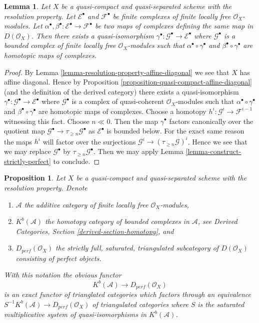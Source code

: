 \documentclass{stacks-project}
\theoremstyle{plain}
\newtheorem{proposition}[subsection]{Proposition}
\newtheorem{lemma}[subsection]{Lemma}
\theoremstyle{definition}
\theoremstyle{remark}
\numberwithin{equation}{subsection}
\begin{document}
\begin{lemma}
\label{lemma-resolution-property-homotopy-map-perfect-complex}
Let $X$ be a quasi-compact and quasi-separated scheme with the
resolution property. Let $\mathcal{E}^\bullet$ and $\mathcal{F}^\bullet$
be finite complexes of finite locally free $\mathcal{O}_X$-modules.
Let $\alpha^\bullet, \beta^\bullet :\mathcal{E}^\bullet \to \mathcal{F}^\bullet$
be two maps of complexes defining the same map in $D(\mathcal{O}_X)$.
Then there exists a quasi-isomorphism
$\gamma^\bullet : \mathcal{G}^\bullet \to \mathcal{E}^\bullet$
where $\mathcal{G}^\bullet$ is a bounded complex of finite locally free
$\mathcal{O}_X$-modules
such that $\alpha^\bullet \circ \gamma^\bullet$ and
$\beta^\bullet \circ \gamma^\bullet$ are homotopic maps of complexes.
\end{lemma}

\begin{proof}
By Lemma \ref{lemma-resolution-property-affine-diagonal}
we see that $X$ has affine diagonal. Hence by
Proposition \ref{proposition-quasi-compact-affine-diagonal}
(and the definition of the derived category)
there exists a quasi-isomorphism
$\gamma^\bullet : \mathcal{G}^\bullet \to \mathcal{E}^\bullet$
where $\mathcal{G}^\bullet$ is a complex of quasi-coherent
$\mathcal{O}_X$-modules
such that $\alpha^\bullet \circ \gamma^\bullet$ and
$\beta^\bullet \circ \gamma^\bullet$ are homotopic maps of complexes.
Choose a homotopy $h^i : \mathcal{G}^i \to \mathcal{F}^{i - 1}$
witnessing this fact. Choose $n \ll 0$. Then the map
$\gamma^\bullet$ factors canonically over the quotient
map $\mathcal{G}^\bullet \to \tau_{\geq n}\mathcal{G}^\bullet$
as $\mathcal{E}^\bullet$ is bounded below. For the exact same
reason the maps $h^i$ will factor over the surjections
$\mathcal{G}^i \to (\tau_{\geq n}\mathcal{G})^i$.
Hence we see that we may replace $\mathcal{G}^\bullet$
by $\tau_{\geq n}\mathcal{G}^\bullet$.
Then we may apply Lemma \ref{lemma-construct-strictly-perfect} to conclude.
\end{proof}

\begin{proposition}
\label{proposition-perfect-resolution-property}
Let $X$ be a quasi-compact and quasi-separated scheme with the
resolution property. Denote
\begin{enumerate}
\item $\mathcal{A}$ the additive category of finite locally free
$\mathcal{O}_X$-modules,
\item $K^b(\mathcal{A})$ the homotopy category of bounded complexes
in $\mathcal{A}$, see
Derived Categories, Section \ref{derived-section-homotopy}, and
\item $D_{perf}(\mathcal{O}_X)$ the strictly full, saturated,
triangulated subcategory of $D(\mathcal{O}_X)$ consisting of
perfect objects.
\end{enumerate}
With this notation the obvious functor
$$
K^b(\mathcal{A}) \longrightarrow D_{perf}(\mathcal{O}_X)
$$
is an exact functor of trianglated categories which factors through an
equivalence $S^{-1}K^b(\mathcal{A}) \to D_{perf}(\mathcal{O}_X)$
of triangulated categories
where $S$ is the saturated multiplicative system of quasi-isomorphisms
in $K^b(\mathcal{A})$.
\end{proposition}
\end{document}
